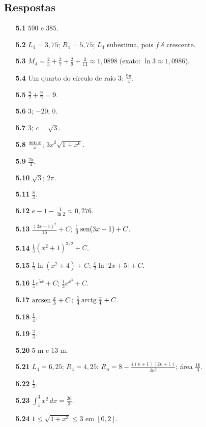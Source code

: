 \subsection*{Respostas}
{\small\begin{multicols}{2}\raggedright
\begin{itemize}[leftmargin=2.7em,labelsep=0.5em,itemsep=1pt]
\item[\textbf{5.1}] $590$ e $385$.
\item[\textbf{5.2}] $L_4=3{,}75$; $R_4=5{,}75$; $L_4$ subestima, pois $f$ é crescente.
\item[\textbf{5.3}] $M_4=\tfrac{2}{5}+\tfrac27+\tfrac29+\tfrac2{11}\approx1{,}0898$ (exato: $\ln3\approx1{,}0986$).
\item[\textbf{5.4}] Um quarto do círculo de raio 3: $\tfrac{9\pi}4$.
\item[\textbf{5.5}] $\tfrac92+\tfrac92=9$.
\item[\textbf{5.6}] $3$; $-20$; $0$.
\item[\textbf{5.7}] $3$; $c=\sqrt3$.
\item[\textbf{5.8}] $\tfrac{\operatorname{sen} x}x$; $3x^2\sqrt{1+x^6}$.
\item[\textbf{5.9}] $\tfrac{25}4$.
\item[\textbf{5.10}] $\sqrt3$; $2\pi$.
\item[\textbf{5.11}] $\tfrac83$.
\item[\textbf{5.12}] $e-1-\tfrac1{\ln2}\approx0{,}276$.
\item[\textbf{5.13}] $\tfrac{(2x+1)^8}{16}+C$; $\tfrac13\operatorname{sen}(3x-1)+C$.
\item[\textbf{5.14}] $\tfrac13(x^2+1)^{3/2}+C$.
\item[\textbf{5.15}] $\tfrac12\ln(x^2+4)+C$; $\tfrac12\ln|2x+5|+C$.
\item[\textbf{5.16}] $\tfrac15e^{5x}+C$; $\tfrac13e^{x^3}+C$.
\item[\textbf{5.17}] $\operatorname{arcsen}\tfrac x3+C$; $\tfrac14\operatorname{arctg}\tfrac x4+C$.
\item[\textbf{5.18}] $\tfrac14$.
\item[\textbf{5.19}] $\tfrac23$.
\item[\textbf{5.20}] $5$ m e $13$ m.
\item[\textbf{5.21}] $L_4=6{,}25$; $R_4=4{,}25$; $R_n=8-\tfrac{4(n+1)(2n+1)}{3n^2}$; área $\tfrac{16}3$.
\item[\textbf{5.22}] $\tfrac14$.
\item[\textbf{5.23}] $\int_1^3x^2\,dx=\tfrac{26}3$.
\item[\textbf{5.24}] $1\le\sqrt{1+x^3}\le3$ em $[0,2]$.

\end{itemize}
\end{multicols}}
